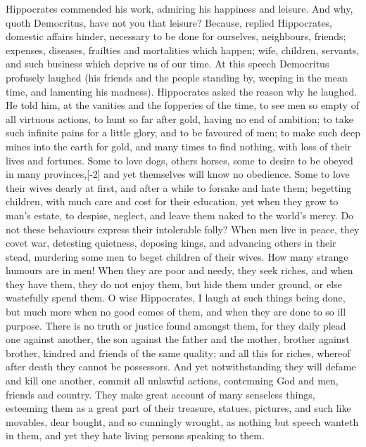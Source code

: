 {Hippocrates commended his work, admiring his happiness and leisure. And
why, quoth Democritus, have not you that leisure? Because, replied
Hippocrates, domestic affairs hinder, necessary to be done for
ourselves, neighbours, friends; expenses, diseases, frailties and
mortalities which happen; wife, children, servants, and such business
which deprive us of our time. At this speech Democritus profusely
laughed (his friends and the people standing by, weeping in the mean
time, and lamenting his madness). Hippocrates asked the reason why he
laughed. He told him, at the vanities and the fopperies of the time, to
see men so empty of all virtuous actions, to hunt so far after gold,
having no end of ambition; to take such infinite pains for a little
glory, and to be favoured of men; to make such deep mines into the
earth for gold, and many times to find nothing, with loss of their
lives and fortunes. Some to love dogs, others horses, some to desire to
be obeyed in many provinces,[-2\baselineskip] and yet themselves will know no
obedience. Some to love their wives dearly at first, and after a
while to forsake and hate them; begetting children, with much care and
cost for their education, yet when they grow to man's estate, to
despise, neglect, and leave them naked to the world's mercy. Do
not these behaviours express their intolerable folly? When men live in
peace, they covet war, detesting quietness,  deposing kings, and
advancing others in their stead, murdering some men to beget children
of their wives. How many strange humours are in men! When they are poor
and needy, they seek riches, and when they have them, they do not enjoy
them, but hide them under ground, or else wastefully spend them. O wise
Hippocrates, I laugh at such things being done, but much more when no
good comes of them, and when they are done to so ill purpose. There is
no truth or justice found amongst them, for they daily plead one
against another, the son against the father and the mother,
brother against brother, kindred and friends of the same quality; and
all this for riches, whereof after death they cannot be possessors. And
yet notwithstanding they will defame and kill one another, commit all
unlawful actions, contemning God and men, friends and country. They
make great account of many senseless things, esteeming them as a great
part of their treasure, statues, pictures, and such like movables, dear
bought, and so cunningly wrought, as nothing but speech wanteth in
them, and yet they hate living persons speaking to them.

}
